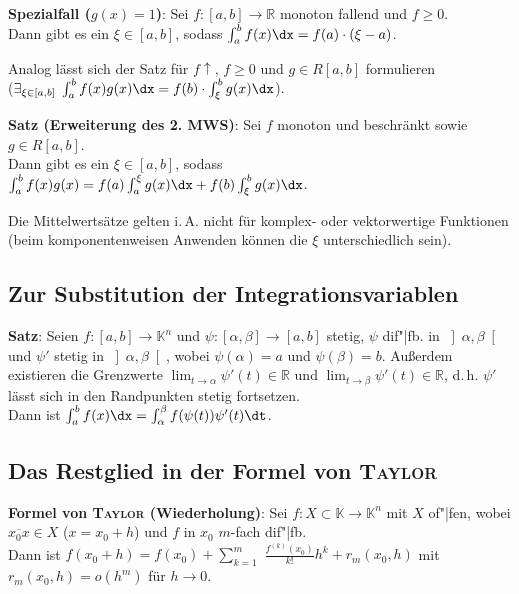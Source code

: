\textbf{Spezialfall ($g(x) = 1$)}:
Sei $f: [a,b] \rightarrow \mathbb{R}$ monoton fallend und $f \ge 0$. \\
Dann gibt es ein $\xi \in [a,b]$, sodass
$\int_a^b f(x)\dx = f(a) \cdot (\xi - a)$.

Analog lässt sich der Satz für $f\!\!\uparrow$, $f \ge 0$ und $g \in R[a,b]$
formulieren \\
($\exists_{\xi \in [a,b]}\; \int_a^b f(x)g(x)\dx =
f(b) \cdot \int_\xi^b g(x)\dx$).

\linie

\textbf{Satz (Erweiterung des 2. MWS)}:
Sei $f$ monoton und beschränkt sowie $g \in R[a,b]$. \\
Dann gibt es ein $\xi \in [a,b]$, sodass
$\int_a^b f(x)g(x) = f(a) \int_a^\xi g(x)\dx + f(b) \int_\xi^b g(x)\dx$.

Die Mittelwertsätze gelten i.\,A. nicht für komplex- oder vektorwertige
Funktionen (beim komponentenweisen Anwenden können die $\xi$ unterschiedlich
sein).

\subsection{%
    Zur Substitution der Integrationsvariablen%
}

\textbf{Satz}:
Seien $f: [a,b] \rightarrow \mathbb{K}^n$ und
$\psi: [\alpha,\beta] \rightarrow [a,b]$ stetig, $\psi$ dif"|fb. in
$\left]\alpha,\beta\right[$ und $\psi'$ stetig in $\left]\alpha,\beta\right[$,
wobei $\psi(\alpha) = a$ und $\psi(\beta) = b$.
Außerdem existieren die Grenzwerte
$\lim_{t \to \alpha} \psi'(t) \in \mathbb{R}$ und
$\lim_{t \to \beta} \psi'(t) \in \mathbb{R}$,
d.\,h. $\psi'$ lässt sich in den Randpunkten stetig fortsetzen. \\
Dann ist $\int_a^b f(x)\dx = \int_\alpha^\beta f(\psi(t)) \psi'(t)\dt$.

\subsection{%
    Das Restglied in der Formel von \textsc{Taylor}%
}

\textbf{Formel von \textsc{Taylor} (Wiederholung)}:
Sei $f: X \subset \mathbb{K} \rightarrow \mathbb{K}^n$ mit $X$ of"|fen,
wobei $\overline{x_0 x} \in X$ ($x = x_0 + h$) und $f$ in $x_0$ $m$-fach
dif"|fb. \\
Dann ist $f(x_0 + h) = f(x_0) + \sum_{k=1}^m$
{\large $\frac{f^{(k)}(x_0)}{k!}$}$h^k +
r_m(x_0, h)$ mit $r_m(x_0, h) = o(h^m)$ für $h \to 0$.

